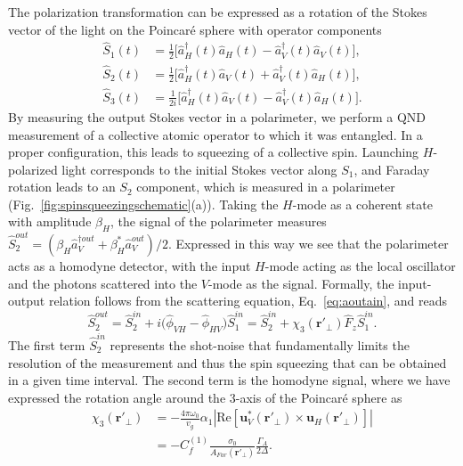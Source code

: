 \documentclass[aps,pra,twocolumn,superscriptaddress]{revtex4-1} %
\newcommand{\nn}{\nonumber}
\newcommand{\mbf}[1]{\mathbf{#1}}
\newcommand{\smallfrac}[2]{\mbox{$\frac{#1}{#2}$}}
\newcommand{\Poincare}{Poincar\'e\xspace}
\begin{document}
The polarization transformation can be expressed as a rotation of the Stokes vector of the light on the \Poincare sphere with operator components
\begin{subequations}\label{Eq::StokesComponents}
	\begin{align}
		\hat{S}_1(t) & = \smallfrac{1}{2}\big[ \hat{a}^\dag_H(t) \hat{a}_H(t)-\hat{a}^\dag_V(t) \hat{a}_V(t) \big], \\
	 	\hat{S}_2(t) & = \smallfrac{1}{2}\big[ \hat{a}^\dag_H(t) \hat{a}_V(t)+\hat{a}^\dag_V(t) \hat{a}_H(t) \big], \\
		\hat{S}_3(t) & = \smallfrac{1}{2i}\big[ \hat{a}^\dag_H(t) \hat{a}_V(t) -\hat{a}^\dag_V(t) \hat{a}_H(t) \big].
	\end{align}
\end{subequations}
By measuring the output Stokes vector in a polarimeter, we perform a QND measurement of a collective atomic operator to which it was entangled.  In a proper configuration, this leads to squeezing of a collective spin.  Launching $H$-polarized light corresponds to the initial Stokes vector along $S_1$, and Faraday rotation leads to an $S_2$ component, which is measured in a polarimeter (Fig.~\ref{fig:spinsqueezingschematic}(a)).  Taking the $H$-mode as a coherent state with amplitude $\beta_H$, the signal of the polarimeter measures $\hat{S}_2^{out} = (\beta_H \hat{a}_V^{\dag out} +\beta^*_H \hat{a}_V^{out})/2$.  Expressed in this way we see that the polarimeter acts as a homodyne detector, with the input $H$-mode acting as the local oscillator and the photons scattered into the $V$-mode as the signal.  Formally, the input-output relation follows from the scattering equation, Eq.~\eqref{eq:aoutain}, and reads
\begin{equation}
\hat{S}^{out}_2 \!=\! \hat{S}^{in}_2 \!+\!i \big( \hat{\phi}_{VH}\!-\! \hat{\phi}_{HV} \big) \hat{S}^{in}_1 \!=\!  \hat{S}^{in}_2 \!+\! \chi_3(\mbf{r}'_\perp) \hat{F}_z \hat{S}^{in}_1.
\end{equation}
The first term $\hat{S}^{in}_2$ represents the shot-noise that fundamentally limits the resolution of the measurement and thus the spin squeezing that can be obtained in a given time interval.  The second term is the homodyne signal, where we have expressed the rotation angle around the 3-axis of the \Poincare sphere as
\begin{align}
\chi_3(\mbf{r}'_\perp) &= -\frac{4 \pi \omega_0}{v_g} \alpha_1 \left\vert \text{Re} \left[ \mbf{u}^*_V (\mbf{r}'_\perp) \times \mbf{u}_H (\mbf{r}'_\perp) \right] \right\vert\nn\\ &=-C^{(1)}_f  \frac{\sigma_0}{A_{Far}(\mbf{r}'_\perp)} \frac{\Gamma_A}{2 \Delta}.
\end{align}
\end{document}
